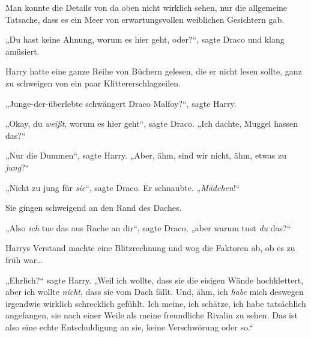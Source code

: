 \later

Man konnte die Details von da oben nicht wirklich sehen, nur die allgemeine Tatsache, dass es ein Meer von erwartungsvollen weiblichen Gesichtern gab.

„Du hast keine Ahnung, worum es hier geht, oder?“, sagte Draco und klang amüsiert.

Harry hatte eine ganze Reihe von Büchern gelesen, die er nicht lesen sollte, ganz zu schweigen von ein paar Klittererschlagzeilen.

„Junge-der-überlebte schwängert Draco Malfoy?“, sagte Harry.

„Okay, du \emph{weißt}, worum es hier geht“, sagte Draco. „Ich dachte, Muggel hassen das?“

„Nur die Dummen“, sagte Harry. „Aber, ähm, sind wir nicht, ähm, etwas zu \emph{jung}?“

„Nicht zu jung für \emph{sie}“, sagte Draco. Er schnaubte. „\emph{Mädchen}!“

Sie gingen schweigend an den Rand des Daches.

„Also \emph{ich} tue das aus Rache an dir“, sagte Draco, „aber warum tust \emph{du} das?“

Harrys Verstand machte eine Blitzrechnung und wog die Faktoren ab, ob es zu früh war…

„Ehrlich?“ sagte Harry. „Weil ich wollte, dass sie die eisigen Wände hochklettert, aber ich wollte \emph{nicht}, dass sie vom Dach fällt. Und, ähm, ich \emph{habe} mich deswegen irgendwie wirklich schrecklich gefühlt. Ich meine, ich schätze, ich habe tatsächlich angefangen, sie nach einer Weile als meine freundliche Rivalin zu sehen. Das ist also eine echte Entschuldigung an sie, keine Verschwörung oder so.“

